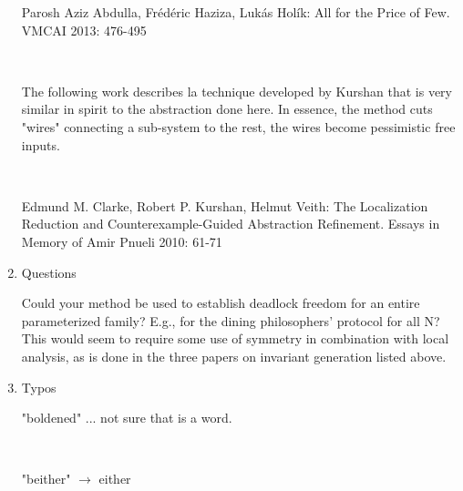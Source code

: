 \begin{enumerate}
Parosh Aziz Abdulla, Frédéric Haziza, Lukás Holík:
All for the Price of Few. VMCAI 2013: 476-495

~

The following work describes la technique developed by Kurshan that is very similar in spirit to the abstraction done here. In essence, the method cuts "wires" connecting a sub-system to the rest, the wires become pessimistic free inputs.

~

Edmund M. Clarke, Robert P. Kurshan, Helmut Veith:
The Localization Reduction and Counterexample-Guided Abstraction Refinement. Essays in Memory of Amir Pnueli 2010: 61-71


\item Questions


Could your method be used to establish deadlock freedom for an entire parameterized family? E.g., for the dining philosophers' protocol for all N? This would seem to require some use of symmetry in combination with local analysis, as is done in the three papers on invariant generation listed above.


\item Typos


"boldened" ... not sure that is a word.

~

"beither" $\rightarrow$ either
\end{enumerate}
